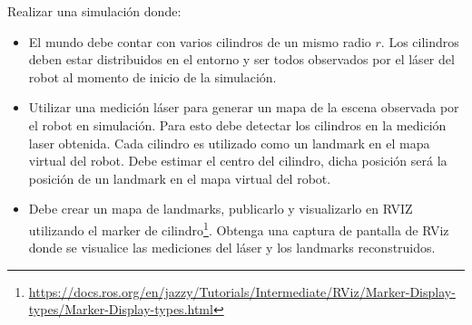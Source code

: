 \documentclass[tp]{lcc}
\begin{document}
\ejercicio Realizar una simulación donde:
\begin{itemize}
    \item El mundo debe contar con varios cilindros de un mismo radio $r$. Los cilindros deben estar distribuidos en el entorno y ser todos observados por el láser del robot al momento de inicio de la simulación.
    \item Utilizar una medición láser para generar un mapa de la escena observada por el robot en simulación. Para esto debe detectar los cilindros en la medición laser obtenida. Cada cilindro es utilizado como un landmark en el mapa virtual del robot. Debe estimar el centro del cilindro, dicha posición será la posición de un landmark en el mapa virtual del robot.
    \item Debe crear un mapa de landmarks, publicarlo y visualizarlo en RVIZ utilizando el marker de cilindro\footnote{\url{https://docs.ros.org/en/jazzy/Tutorials/Intermediate/RViz/Marker-Display-types/Marker-Display-types.html}}. Obtenga una captura de pantalla de RViz donde se visualice las mediciones del láser y los landmarks reconstruidos.
\end{itemize}





\printbibliography
\end{document}
